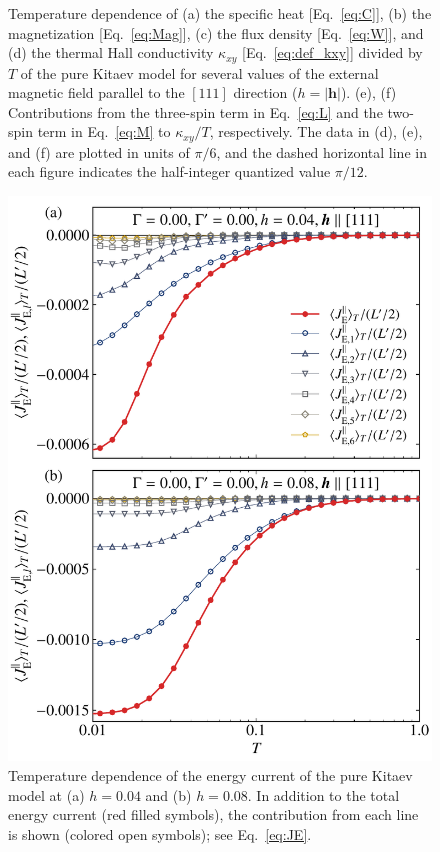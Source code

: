 \documentclass[twocolumn,superscriptaddress,showpacs, longbibliography, aps, prx]{revtex4-2}
\begin{document}
\begin{figure}[tbh]
\begin{center}
  \end{center}
  \caption{Temperature dependence of (a) the specific heat [Eq.~\eqref{eq:C}], (b) the magnetization [Eq.~\eqref{eq:Mag}], (c) the flux density [Eq.~\eqref{eq:W}], and (d) the thermal Hall conductivity $\kappa_{xy}$ [Eq.~\eqref{eq:def_kxy}] divided by $T$ of the pure Kitaev model for several values of the external magnetic field parallel to the $[111]$ direction ($h=|\bm{h}|$). (e), (f) Contributions from the three-spin term in Eq.~\eqref{eq:L} and the two-spin term in Eq.~\eqref{eq:M} to $\kappa_{xy}/T$, respectively. The data in (d), (e), and (f) are plotted in units of $\pi/6$, and the dashed horizontal line in each figure indicates the half-integer quantized value $\pi/12$.
  }
  \label{fig:CMF_pure}
\end{figure}

\begin{figure}[tbh]
  \begin{center}
    \includegraphics[width=\linewidth]{Data_for_figs/plot/fig-06-XTRG-Jline_all.pdf}
  \end{center}
  \caption{Temperature dependence of the energy current of the pure Kitaev model at (a) $h=0.04$ and (b) $h=0.08$. In addition to the total energy current (red filled symbols), the contribution from each line is shown (colored open symbols); see Eq.~\eqref{eq:JE}.
}
  \label{fig:J_line}
\end{figure}
\end{document}
